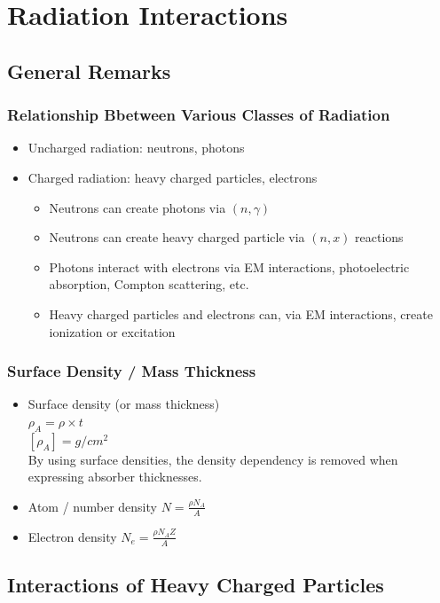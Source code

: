 \section{Radiation Interactions}
\subsection{General Remarks}
\subsubsection{Relationship Bbetween Various Classes of Radiation}
\begin{itemize}
    \item Uncharged radiation: neutrons, photons
    \item Charged radiation: heavy charged particles, electrons
    \begin{itemize}
        \item Neutrons can create photons via $(n,\gamma)$
        \item Neutrons can create heavy charged particle via $(n,x)$ reactions
        \item Photons interact with electrons via EM interactions, photoelectric absorption, Compton scattering, etc.
        \item Heavy charged particles and electrons can, via EM interactions, create ionization or excitation 
    \end{itemize}
\end{itemize}
\subsubsection{Surface Density / Mass Thickness}
\begin{itemize}
    \item Surface density (or mass thickness)\\
    $\rho_A=\rho\times t$\\
    $[\rho_A]=g/cm^2$\\
    By using surface densities, the density dependency is removed when expressing absorber thicknesses.
    \item Atom / number density $N=\frac{\rho N_A}{A}$
    \item Electron density $N_e=\frac{\rho N_A Z}{A}$
\end{itemize}
\subsection{Interactions of Heavy Charged Particles}

